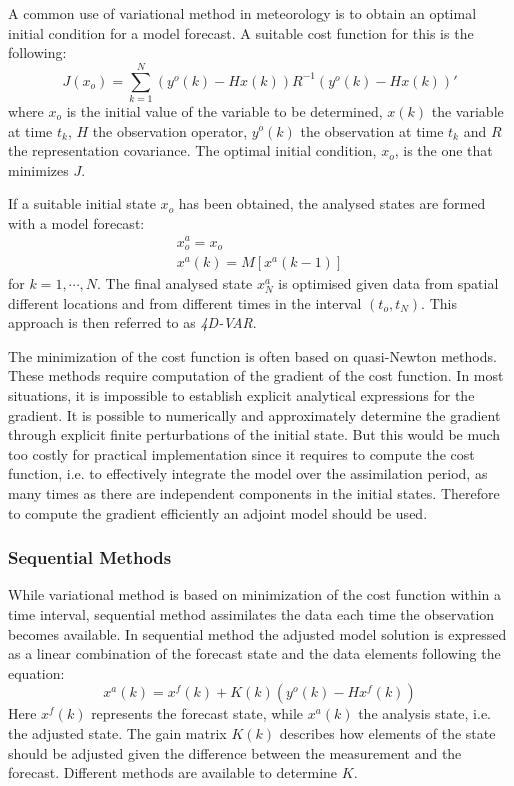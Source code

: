 \documentclass[a4paper,12pt]{article}
\begin{document}
      A common use of variational method in meteorology is to obtain an optimal initial condition for a model forecast. A suitable cost function for this is the following:
      \begin{equation}
      \label{eq.costfunction1}
        J(x_o) = \sum_{k=1}^N (y^o(k)-Hx(k))R^{-1}(y^o(k)-Hx(k))'
      \end{equation}
      where $x_o$ is the initial value of the variable to be determined, $x(k)$ the variable at time $t_k$, $H$ the observation operator, $y^o(k)$ the observation at time $t_k$ and $R$ the representation covariance. The optimal initial condition, $x_o$, is the one that minimizes $J$.

      If a suitable initial state $x_o$ has been obtained, the analysed states are formed with a model forecast:
      \begin{eqnarray}
          x^a_o = x_o \\
          x^a(k) = M[x^a(k-1)]
      \end{eqnarray}
      for $k=1, \cdots, N$. The final analysed state $x^a_N$ is optimised given data from spatial different locations and from different times in the interval $(t_o,t_N)$. This approach is then referred to as \emph{4D-VAR}. %

      The minimization of the cost function is often based on quasi-Newton methods. These methods require computation of the gradient of the cost function. In most situations, it is impossible to establish explicit analytical expressions for the gradient. It is possible to numerically and approximately determine the gradient through explicit finite perturbations of the initial state. But this would be much too costly for practical implementation since it requires to compute the cost function, i.e. to effectively integrate the model over the assimilation period, as many times as there are independent components in the initial states. Therefore to compute the gradient efficiently an adjoint model should be used.

   \subsubsection{Sequential Methods}
      While variational method is based on minimization of the cost function within a time interval, sequential method assimilates the data each time the observation becomes available. In sequential method the adjusted model solution is expressed as a linear combination of the forecast state and the data elements following the equation:
      \begin{equation}
        x^a(k) = x^f(k) + K(k)(y^o(k)-Hx^f(k))
      \end{equation}
      Here $x^f(k)$ represents the forecast state, while $x^a(k)$ the analysis state, i.e. the adjusted state. The gain matrix $K(k)$ describes how elements of the state should be adjusted given the difference between the measurement and the forecast. Different methods are available to determine $K$.
\end{document}
